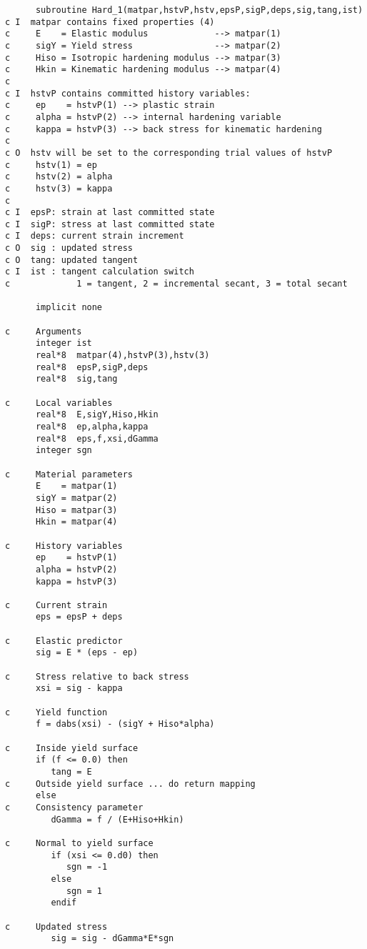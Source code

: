 \documentclass[12pt]{article}
\begin{document}
{\sf\small
\begin{verbatim}
      subroutine Hard_1(matpar,hstvP,hstv,epsP,sigP,deps,sig,tang,ist)
c I  matpar contains fixed properties (4)
c     E    = Elastic modulus             --> matpar(1)
c     sigY = Yield stress                --> matpar(2)
c     Hiso = Isotropic hardening modulus --> matpar(3)
c     Hkin = Kinematic hardening modulus --> matpar(4)
c
c I  hstvP contains committed history variables:
c     ep    = hstvP(1) --> plastic strain
c     alpha = hstvP(2) --> internal hardening variable
c     kappa = hstvP(3) --> back stress for kinematic hardening
c	 
c O  hstv will be set to the corresponding trial values of hstvP
c     hstv(1) = ep    
c     hstv(2) = alpha 
c     hstv(3) = kappa 
c
c I  epsP: strain at last committed state
c I  sigP: stress at last committed state
c I  deps: current strain increment
c O  sig : updated stress
c O  tang: updated tangent
c I  ist : tangent calculation switch 
c             1 = tangent, 2 = incremental secant, 3 = total secant

      implicit none
 
c     Arguments
      integer ist
      real*8  matpar(4),hstvP(3),hstv(3)
      real*8  epsP,sigP,deps
      real*8  sig,tang

c     Local variables
      real*8  E,sigY,Hiso,Hkin
      real*8  ep,alpha,kappa   
      real*8  eps,f,xsi,dGamma
      integer sgn

c     Material parameters
      E    = matpar(1)
      sigY = matpar(2)
      Hiso = matpar(3)
      Hkin = matpar(4)

c     History variables
      ep    = hstvP(1)
      alpha = hstvP(2)
      kappa = hstvP(3)

c     Current strain
      eps = epsP + deps    

c     Elastic predictor
      sig = E * (eps - ep)

c     Stress relative to back stress
      xsi = sig - kappa

c     Yield function
      f = dabs(xsi) - (sigY + Hiso*alpha)

c     Inside yield surface
      if (f <= 0.0) then
         tang = E
c     Outside yield surface ... do return mapping
      else
c     Consistency parameter
         dGamma = f / (E+Hiso+Hkin)

c     Normal to yield surface
         if (xsi <= 0.d0) then
            sgn = -1
         else
            sgn = 1
         endif

c     Updated stress
         sig = sig - dGamma*E*sgn
	

\end{verbatim}}
\end{document}
